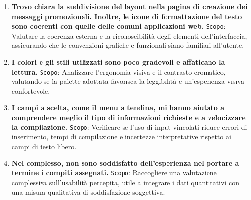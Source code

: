 \begin{enumerate}
	\item \textbf{Trovo chiara la suddivisione del layout nella pagina di creazione dei messaggi promozionali. Inoltre, le icone di formattazione del testo sono coerenti con quelle delle comuni applicazioni web.}
	\newline
	\texttt{Scopo}: Valutare la coerenza esterna e la riconoscibilità degli elementi dell’interfaccia, assicurando che le convenzioni grafiche e funzionali siano familiari all’utente.
	
	\item \textbf{I colori e gli stili utilizzati sono poco gradevoli e affaticano la lettura.}
	\newline
	\texttt{Scopo}: Analizzare l’ergonomia visiva e il contrasto cromatico, valutando se la palette adottata favorisca la leggibilità e un’esperienza visiva confortevole.
	
	\item \textbf{I campi a scelta, come il menu a tendina, mi hanno aiutato a comprendere meglio il tipo di informazioni richieste e a velocizzare la compilazione.}
	\newline
	\texttt{Scopo}: Verificare se l’uso di input vincolati riduce errori di inserimento, tempi di compilazione e incertezze interpretative rispetto ai campi di testo libero.
	
	\item \textbf{Nel complesso, non sono soddisfatto dell’esperienza nel portare a termine i compiti assegnati.}
	\newline
	\texttt{Scopo}: Raccogliere una valutazione complessiva sull’usabilità percepita, utile a integrare i dati quantitativi con una misura qualitativa di soddisfazione soggettiva.
	
\end{enumerate}


